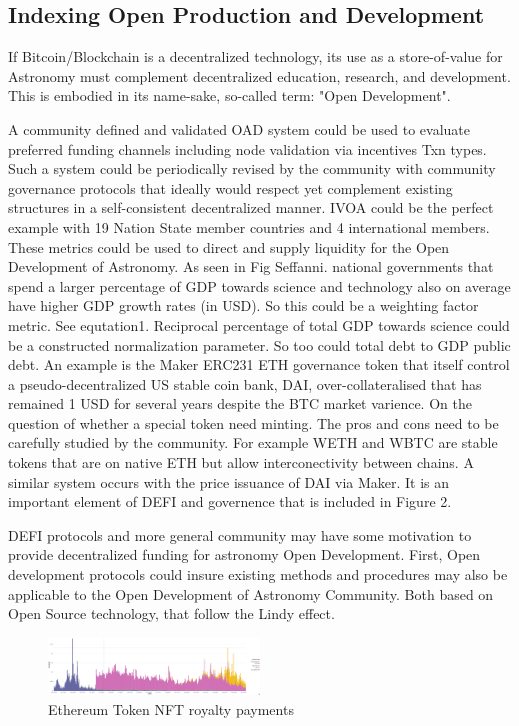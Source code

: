 \documentclass[final,5p,times,twocolumn,authoryear]{elsarticle}
\begin{document}
\subsection{Indexing Open Production and Development}

If Bitcoin/Blockchain is a decentralized technology, its use as a store-of-value for Astronomy must complement decentralized education, research, and development. This is embodied in its name-sake, so-called term: "Open Development".

A community defined and validated OAD system could be used to evaluate preferred funding channels including node validation via incentives Txn types. Such a system could be periodically revised by the community with community governance protocols that ideally would respect yet complement existing structures in a self-consistent decentralized manner. IVOA could be the perfect example with 19 Nation State member countries and 4 international members. These metrics could be used to direct and supply liquidity for the Open Development of Astronomy. As seen in Fig Seffanni. national governments that spend a larger percentage of GDP towards science and technology also on average have higher GDP growth rates (in USD). So this could be a weighting factor metric. See equtation1. Reciprocal percentage of total GDP towards science could be a constructed normalization parameter. So too could total debt to GDP public debt.  An example is the Maker ERC231 ETH governance token that itself control a  pseudo-decentralized US stable coin bank, DAI, over-collateralised that has remained 1 USD for several years despite the BTC market varience.  On the question of whether a special token need minting. The pros and cons need to be carefully studied by the community. For example WETH and WBTC are stable tokens that are on native ETH but allow interconectivity between chains. A similar system occurs with the price issuance of DAI via Maker. It is an important element of DEFI and governence that is included in Figure 2.   

DEFI protocols and more general community may have some motivation to provide decentralized funding for astronomy Open Development. First, Open development protocols could insure existing methods and procedures may also be applicable to the Open Development of Astronomy Community. Both  based on Open Source technology, that follow the Lindy effect.

 \begin{figure}
    \centering
    \includegraphics[width=0.5\textwidth]{figs/royalty_pay.jpg}
    \caption{Ethereum Token NFT royalty payments}
\end{figure}
\end{document}
